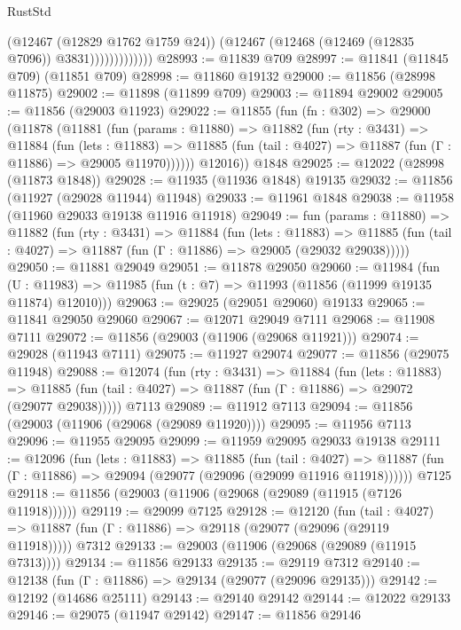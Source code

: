 \begin{lexlean}{RustStd}
\begin{coremodule}
                          (@12467 (@12829 @1762 @1759 @24))
                          (@12467 (@12468 (@12469 (@12835 @7096)) @3831)))))))))))))
@28993 := @11839 @709
@28997 := @11841 (@11845 @709) (@11851 @709)
@28998 := @11860 @19132
@29000 := @11856 (@28998 @11875)
@29002 := @11898 (@11899 @709)
@29003 := @11894 @29002
@29005 := @11856 (@29003 @11923)
@29022 := @11855
    (fun (fn : @302) =>
    @29000
      (@11878
        (@11881
          (fun (params : @11880) =>
          @11882
            (fun (rty : @3431) =>
            @11884
              (fun (lets : @11883) =>
              @11885 (fun (tail : @4027) => @11887 (fun (Γ : @11886) => @29005 @11970))))))
        @12016))
    @1848
@29025 := @12022 (@28998 (@11873 @1848))
@29028 := @11935 (@11936 @1848) @19135
@29032 := @11856 (@11927 (@29028 @11944) @11948)
@29033 := @11961 @1848
@29038 := @11958 (@11960 @29033 @19138 @11916 @11918)
@29049 := fun (params : @11880) =>
  @11882
    (fun (rty : @3431) =>
    @11884
      (fun (lets : @11883) =>
      @11885 (fun (tail : @4027) => @11887 (fun (Γ : @11886) => @29005 (@29032 @29038)))))
@29050 := @11881 @29049
@29051 := @11878 @29050
@29060 := @11984
    (fun (U : @11983) => @11985 (fun (t : @7) => @11993 (@11856 (@11999 @19135 @11874) @12010)))
@29063 := @29025 (@29051 @29060) @19133
@29065 := @11841 @29050 @29060
@29067 := @12071 @29049 @7111
@29068 := @11908 @7111
@29072 := @11856 (@29003 (@11906 (@29068 @11921)))
@29074 := @29028 (@11943 @7111)
@29075 := @11927 @29074
@29077 := @11856 (@29075 @11948)
@29088 := @12074
    (fun (rty : @3431) =>
    @11884
      (fun (lets : @11883) =>
      @11885 (fun (tail : @4027) => @11887 (fun (Γ : @11886) => @29072 (@29077 @29038)))))
    @7113
@29089 := @11912 @7113
@29094 := @11856 (@29003 (@11906 (@29068 (@29089 @11920))))
@29095 := @11956 @7113
@29096 := @11955 @29095
@29099 := @11959 @29095 @29033 @19138
@29111 := @12096
    (fun (lets : @11883) =>
    @11885
      (fun (tail : @4027) =>
      @11887 (fun (Γ : @11886) => @29094 (@29077 (@29096 (@29099 @11916 @11918))))))
    @7125
@29118 := @11856 (@29003 (@11906 (@29068 (@29089 (@11915 (@7126 @11918))))))
@29119 := @29099 @7125
@29128 := @12120
    (fun (tail : @4027) => @11887 (fun (Γ : @11886) => @29118 (@29077 (@29096 (@29119 @11918)))))
    @7312
@29133 := @29003 (@11906 (@29068 (@29089 (@11915 @7313))))
@29134 := @11856 @29133
@29135 := @29119 @7312
@29140 := @12138 (fun (Γ : @11886) => @29134 (@29077 (@29096 @29135)))
@29142 := @12192 (@14686 @25111)
@29143 := @29140 @29142
@29144 := @12022 @29133
@29146 := @29075 (@11947 @29142)
@29147 := @11856 @29146

\end{coremodule}
\end{lexlean}
